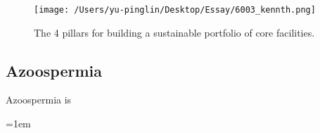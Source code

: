 \documentclass[12pt]{article}
\begin{document}
\begin{figure}[H]
    \texttt{[image: /Users/yu-pinglin/Desktop/Essay/6003\_kennth.png]}
    \centering
    \caption{The 4 pillars for building a sustainable portfolio of
    core facilities.}
\end{figure}

\subsection{Azoospermia}
Azoospermia is 






\emergencystretch=1em
\printbibliography[title=Reference]
\end{document}

